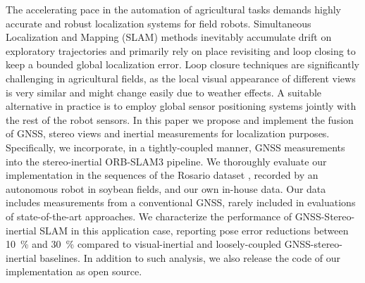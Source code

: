 The accelerating pace in the automation of agricultural tasks demands highly accurate and robust localization systems for field robots. Simultaneous Localization and Mapping (SLAM) methods inevitably accumulate drift on exploratory trajectories and primarily rely on place revisiting and loop closing to keep a bounded global localization error. Loop closure techniques are significantly challenging in agricultural fields, as the local visual appearance of different views is very similar and might change easily due to weather effects. A suitable alternative in practice is to employ global sensor positioning systems jointly with the rest of the robot sensors.
In this paper we propose and implement the fusion of GNSS, stereo views and inertial measurements for localization purposes. Specifically, we incorporate, in a tightly-coupled manner, GNSS measurements into the stereo-inertial ORB-SLAM3 pipeline. We thoroughly evaluate our implementation in the sequences of the Rosario dataset \cite{pire2019rosario}, recorded by an autonomous robot in soybean fields, and our own in-house data. Our data includes measurements from a conventional GNSS, rarely included in evaluations of state-of-the-art approaches. We characterize the performance of GNSS-Stereo-inertial SLAM in this application case, reporting pose error reductions between \SI{10}{\percent} and \SI{30}{\percent} compared to visual-inertial and loosely-coupled GNSS-stereo-inertial baselines. In addition to such analysis, we also release the code of our implementation as open source.
